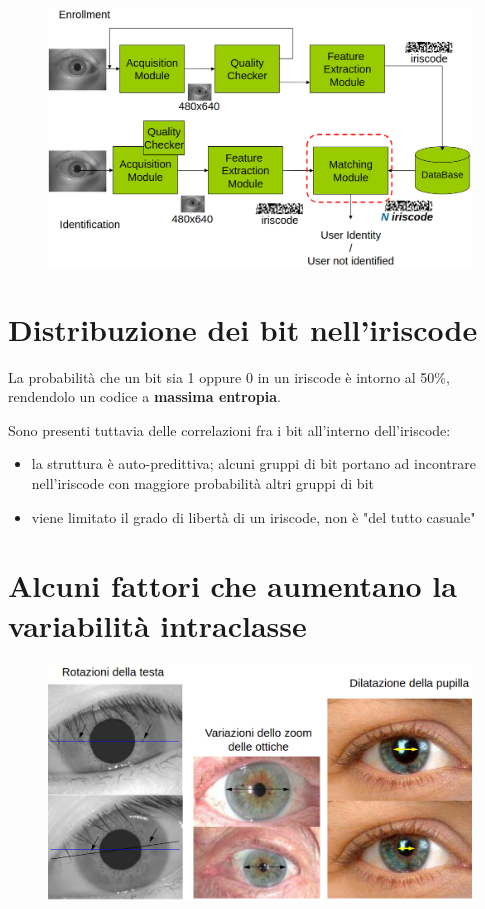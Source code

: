 \documentclass{report}
\begin{document}
\begin{figure}[ht]
    \centering
    \includegraphics[width=1\linewidth]{images/intro-chap3.png}
\end{figure}

\section{Distribuzione dei bit nell'iriscode}
La probabilità che un bit sia 1 oppure 0 in un iriscode è 
intorno al 50\%, rendendolo un codice a \textbf{massima entropia}.

\noindent Sono presenti tuttavia delle correlazioni fra i bit all'interno 
dell'iriscode:
\begin{itemize}
    \item la struttura è auto-predittiva; alcuni gruppi di bit portano ad incontrare nell'iriscode 
    con maggiore probabilità altri gruppi di bit 
    \item viene limitato il grado di libertà di un iriscode, non è "del tutto casuale"
\end{itemize}

\section{Alcuni fattori che aumentano la variabilità intraclasse}

\begin{figure}[ht]
    \centering
    \includegraphics[width=0.9\linewidth]{images/variabilita-intraclasse.png}
\end{figure}
\end{document}
